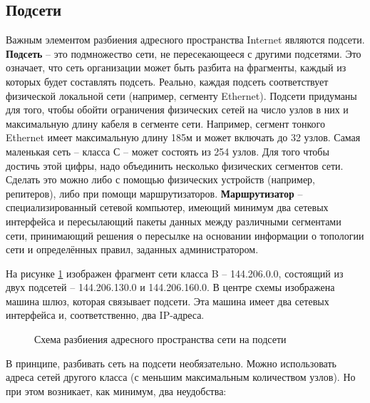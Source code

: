 \documentclass[a4paper]{article}
\begin{document}
\subsection{Подсети}

	Важным элементом разбиения адресного пространства Internet являются подсети. \textbf{Подсеть} -- это подмножество сети, не пересекающееся с другими подсетями. Это означает, что сеть организации может быть разбита на фрагменты, каждый из которых будет составлять подсеть. Реально, каждая подсеть соответствует физической локальной сети (например, сегменту Ethernet). Подсети придуманы для того, чтобы обойти ограничения физических сетей на число узлов в них и максимальную длину кабеля в сегменте сети. Например, сегмент тонкого Ethernet имеет максимальную длину 185м и может включать до 32 узлов. Самая маленькая сеть -- класса С -- может состоять из 254 узлов. Для того чтобы достичь этой цифры, надо объединить несколько физических сегментов сети. Сделать это можно либо с помощью физических устройств (например, репитеров), либо при помощи маршрутизаторов. \textbf{Маршрутизатор} -- специализированный сетевой компьютер, имеющий минимум два сетевых интерфейса и пересылающий пакеты данных между различными сегментами сети, принимающий решения о пересылке на основании информации о топологии сети и определённых правил, заданных администратором.

	На рисунке \ref{fig:addresSceme} изображен фрагмент сети класса B -- 144.206.0.0, состоящий из двух подсетей -- 144.206.130.0 и 144.206.160.0. В центре схемы изображена машина шлюз, которая связывает подсети. Эта машина имеет два сетевых интерфейса и, соответственно, два IP-адреса.

	\begin{figure}[h]
		\caption{Схема разбиения адресного пространства сети на подсети}
		\label{fig:addresSceme}
	\end{figure}

	В принципе, разбивать сеть на подсети необязательно. Можно использовать адреса сетей другого 
класса (с меньшим максимальным количеством узлов). Но при этом возникает, как минимум, два 
неудобства:
\end{document}
